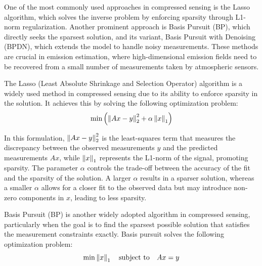 One of the most commonly used approaches in compressed sensing is the Lasso algorithm, which solves the inverse problem by enforcing sparsity through L1-norm regularization.
Another prominent approach is Basis Pursuit (BP), which directly seeks the sparsest solution, and its variant, Basis Pursuit with Denoising (BPDN), which extends the model to handle noisy measurements.
These methods are crucial in emission estimation, where high-dimensional emission fields need to be recovered from a small number of measurements taken by atmospheric sensors.

The Lasso (Least Absolute Shrinkage and Selection Operator) algorithm is a widely used method in compressed sensing due to its ability to enforce sparsity in the solution.
It achieves this by solving the following optimization problem:
\begin{equation}
    \min{\left( \left\lVert Ax -y \right\rVert_2^2 + \alpha\left\lVert x\right\rVert_1 \right)}
\end{equation}

In this formulation, $\left\lVert Ax -y \right\rVert_2^2$ is the least-squares term that measures the discrepancy between the observed measurements $y$ and the predicted measurements $Ax$, while $\left\lVert x\right\rVert_1$ represents the L1-norm of the signal, promoting sparsity.
The parameter $\alpha$ controls the trade-off between the accuracy of the fit and the sparsity of the solution.
A larger $\alpha$ results in a sparser solution, whereas a smaller $\alpha$ allows for a closer fit to the observed data but may introduce non-zero components in $x$, leading to less sparsity.


Basis Pursuit (BP) is another widely adopted algorithm in compressed sensing, particularly when the goal is to find the sparsest possible solution that satisfies the measurement constraints exactly.
Basis pursuit solves the following optimization problem:
\begin{equation}
    \min \left\lVert x\right\rVert_1 \quad \text{subject to} \quad  Ax = y
\end{equation}


